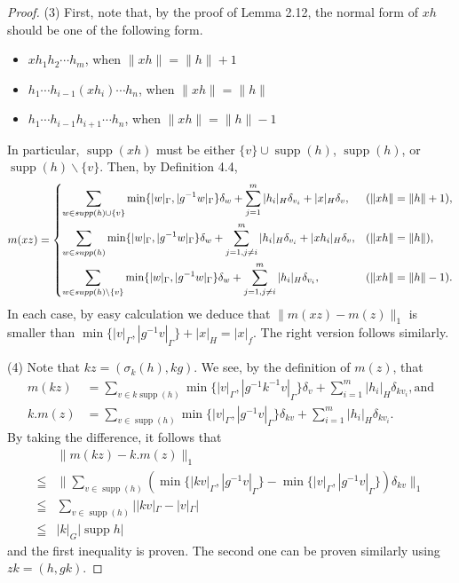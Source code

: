 \documentclass{amsart}
\theoremstyle{definition}
\begin{document}
\begin{proof}
(3) First, note that, by the proof of Lemma 2.12, the normal form of $xh$ should be one of the following form. 
\begin{itemize}
\item $xh_1h_2\cdots h_m$, when $\|xh\| = \| h\| +1$
\item $h_1\cdots h_{i-1}(xh_i)\cdots h_n$,  when $\|xh\| = \| h\|$
\item $h_1\cdots h_{i-1}h_{i+1}\cdots h_n$, when $\|xh\| = \| h\| -1$
\end{itemize}
In particular, $\mathop{supp}(xh)$ must be either $\{v\} \cup \mathop{supp}(h)$,  $\mathop{supp}(h)$, or $\mathop{supp}(h) \backslash \{ v \}$. 
Then, by Definition 4.4, 
\begin{align}
m(xz) = 
\begin{dcases}
\sum_{w\in \mathop{supp}(h)\cup \{ v \}} \min\{ |w|_{\Gamma}, |g^{-1}w|_{\Gamma}\} \delta_{w}+ \sum_{j=1}^m |h_i|_{H} \delta_{v_i} + |x|_H\delta_v,  
& (\|xh\| = \| h\| +1), \\
\sum_{w\in \mathop{supp}(h)} \min\{ |w|_{\Gamma}, |g^{-1}w|_{\Gamma}\} \delta_{w}+ \sum_{j=1, j\neq i}^m |h_i|_{H} \delta_{v_i} + |xh_i|_H\delta_v,  
& (\|xh\| = \| h\| ), \\
\sum_{w\in \mathop{supp}(h)\backslash \{ v \}} \min\{ |w|_{\Gamma}, |g^{-1}w|_{\Gamma}\} \delta_{w}+ \sum_{j=1, j\neq i}^m |h_i|_{H} \delta_{v_i}, 
& (\|xh\| = \| h\| -1).
\end{dcases}
\end{align}
In each case, by easy calculation we deduce that $\| m(xz)-m(z) \|_1 $ is smaller than $\min\{ |v|_{\Gamma}, |g^{-1}v|_{\Gamma}\} + |x|_H = |x|_f$. 
The right version follows similarly. 

(4) Note that $kz=(\sigma_k(h), kg)$. We see, by the definition of $m(z)$, that
\begin{align}
m(kz) &= \sum_{v\in k\mathop{supp}(h)} \min\{ |v|_{\Gamma}, |g^{-1}k^{-1}v|_{\Gamma}\} \delta_{v}+ \sum_{i=1}^m |h_i|_{H} \delta_{kv_i}, \text{and}
\\
k.m(z) &= \sum_{v\in \mathop{supp}(h)} \min\{ |v|_{\Gamma}, |g^{-1}v|_{\Gamma}\} \delta_{kv}+ \sum_{i=1}^m |h_i|_{H} \delta_{kv_i}. 
\end{align}
By taking the difference, it follows that 
\begin{align}
&\| m(kz)-k.m(z) \|_1 \\
\leqq 
&\| \sum_{v\in \mathop{supp}(h)} (\min\{ |kv|_{\Gamma}, |g^{-1}v|_{\Gamma}\} - \min\{ |v|_{\Gamma}, |g^{-1}v|_{\Gamma}\}) \delta_{kv} \|_1 \\
\leqq 
&\sum_{v\in \mathop{supp}(h)} | |kv|_{\Gamma} - |v|_{\Gamma} | \\
\leqq 
&|k|_G|\mathop{supp}h|
\end{align}
and the first inequality is proven. The second one can be proven similarly using 
$zk=(h,gk)$. 
\end{proof}
\end{document}
